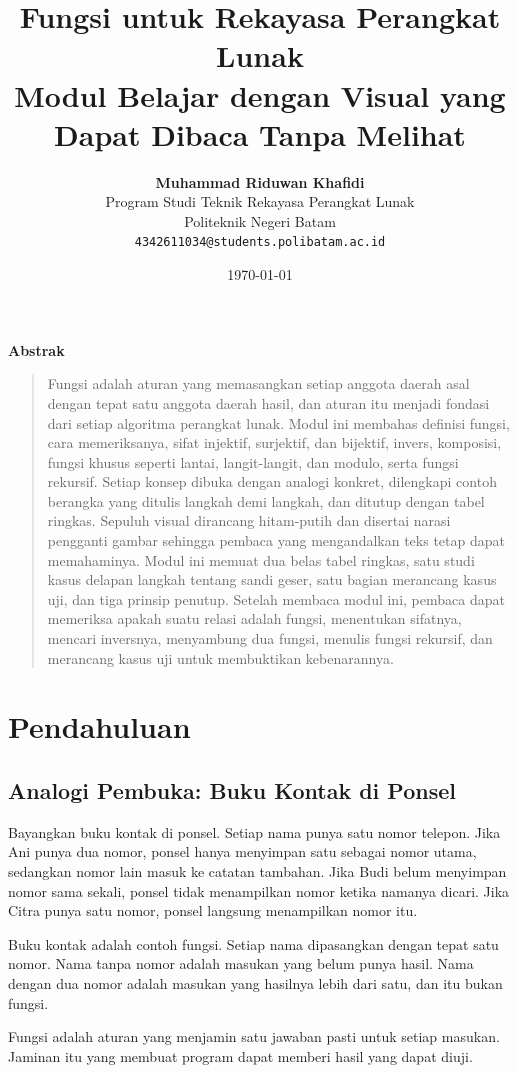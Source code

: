 \documentclass[11pt,a4paper]{article}
\title{\vspace{-1.5cm}\textbf{\sffamily\LARGE Fungsi untuk Rekayasa Perangkat Lunak\\ Modul Belajar dengan Visual yang Dapat Dibaca Tanpa Melihat}}
\author{
	\textbf{Muhammad Riduwan Khafidi} \\
	\small Program Studi Teknik Rekayasa Perangkat Lunak \\
	\small Politeknik Negeri Batam \\
	\small \texttt{4342611034@students.polibatam.ac.id}
}
\date{\small\today}
\renewenvironment{abstract}
{\small
	\begin{center}\textbf{\sffamily Abstrak}\end{center}
	\begin{quote}}
	{\end{quote}}
\begin{document}
\maketitle
\thispagestyle{empty}

\begin{abstract}
	Fungsi adalah aturan yang memasangkan setiap anggota daerah asal dengan tepat satu anggota daerah hasil, dan aturan itu menjadi fondasi dari setiap algoritma perangkat lunak. Modul ini membahas definisi fungsi, cara memeriksanya, sifat injektif, surjektif, dan bijektif, invers, komposisi, fungsi khusus seperti lantai, langit-langit, dan modulo, serta fungsi rekursif. Setiap konsep dibuka dengan analogi konkret, dilengkapi contoh berangka yang ditulis langkah demi langkah, dan ditutup dengan tabel ringkas. Sepuluh visual dirancang hitam-putih dan disertai narasi pengganti gambar sehingga pembaca yang mengandalkan teks tetap dapat memahaminya. Modul ini memuat dua belas tabel ringkas, satu studi kasus delapan langkah tentang sandi geser, satu bagian merancang kasus uji, dan tiga prinsip penutup. Setelah membaca modul ini, pembaca dapat memeriksa apakah suatu relasi adalah fungsi, menentukan sifatnya, mencari inversnya, menyambung dua fungsi, menulis fungsi rekursif, dan merancang kasus uji untuk membuktikan kebenarannya.
\end{abstract}

\section{Pendahuluan}

\subsection{Analogi Pembuka: Buku Kontak di Ponsel}

Bayangkan buku kontak di ponsel. Setiap nama punya satu nomor telepon. Jika Ani punya dua nomor, ponsel hanya menyimpan satu sebagai nomor utama, sedangkan nomor lain masuk ke catatan tambahan. Jika Budi belum menyimpan nomor sama sekali, ponsel tidak menampilkan nomor ketika namanya dicari. Jika Citra punya satu nomor, ponsel langsung menampilkan nomor itu.

Buku kontak adalah contoh fungsi. Setiap nama dipasangkan dengan tepat satu nomor. Nama tanpa nomor adalah masukan yang belum punya hasil. Nama dengan dua nomor adalah masukan yang hasilnya lebih dari satu, dan itu bukan fungsi.

Fungsi adalah aturan yang menjamin satu jawaban pasti untuk setiap masukan. Jaminan itu yang membuat program dapat memberi hasil yang dapat diuji.
\end{document}
